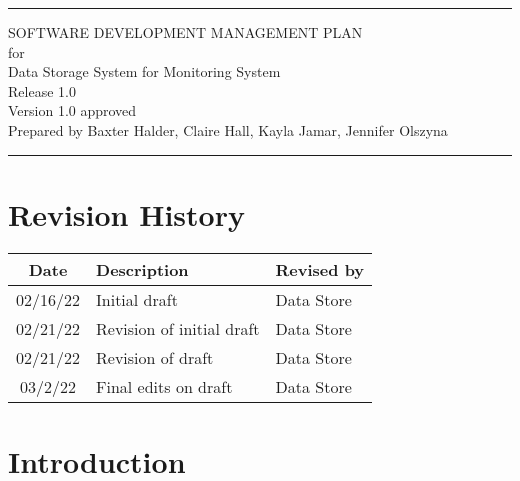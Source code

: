 \documentclass[letterpaper,12pt,oneside,listof=totoc]{scrreprt}
\date{\today}
\author{} %
\def\myversion{1.0 }
\begin{document}
\begin{titlepage}
\flushright
\rule{\textwidth}{5pt}\vskip1cm
\Huge{SOFTWARE DEVELOPMENT MANAGEMENT PLAN}\\
\vspace{1.3cm}
for\\
\vspace{1.3cm}
Data Storage System for Monitoring System\\
\vspace{1.3cm}
\LARGE{Release 1.0\\}
\vspace{1.3cm}
\LARGE{Version \myversion approved\\}
\vspace{1.3cm}
Prepared by Baxter Halder, Claire Hall, Kayla Jamar, Jennifer Olszyna\\
\vfill
\rule{\textwidth}{5pt}
\end{titlepage}

\tableofcontents %
\listoffigures %
\listoftables %

\chapter*{Revision History} %
\begin{tabular}{| c | p{} | p{} |}
    \hline
    Date     & Description   & Revised by \\
    \hline
    02/16/22 & Initial draft & Data Store \\
    \hline
    02/21/22 & Revision of initial draft & Data Store \\
    \hline
    02/21/22 & Revision of draft & Data Store \\
    \hline
    03/2/22 & Final edits on draft & Data Store \\
    \hline
\end{tabular}

\chapter{Introduction}
\end{document}
